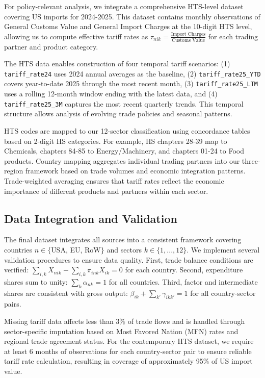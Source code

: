 For policy-relevant analysis, we integrate a comprehensive HTS-level dataset covering US imports for 2024-2025. This dataset contains monthly observations of General Customs Value and General Import Charges at the 10-digit HTS level, allowing us to compute effective tariff rates as $\tau_{nik} = \frac{\text{Import Charges}}{\text{Customs Value}}$ for each trading partner and product category.

The HTS data enables construction of four temporal tariff scenarios: (1) \texttt{tariff\_rate24} uses 2024 annual averages as the baseline, (2) \texttt{tariff\_rate25\_YTD} covers year-to-date 2025 through the most recent month, (3) \texttt{tariff\_rate25\_LTM} uses a rolling 12-month window ending with the latest data, and (4) \texttt{tariff\_rate25\_3M} captures the most recent quarterly trends. This temporal structure allows analysis of evolving trade policies and seasonal patterns.

HTS codes are mapped to our 12-sector classification using concordance tables based on 2-digit HS categories. For example, HS chapters 28-39 map to Chemicals, chapters 84-85 to Energy/Machinery, and chapters 01-24 to Food products. Country mapping aggregates individual trading partners into our three-region framework based on trade volumes and economic integration patterns. Trade-weighted averaging ensures that tariff rates reflect the economic importance of different products and partners within each sector.

\subsection{Data Integration and Validation}

The final dataset integrates all sources into a consistent framework covering countries $n \in \{$USA, EU, RoW$\}$ and sectors $k \in \{1, ..., 12\}$. We implement several validation procedures to ensure data quality. First, trade balance conditions are verified: $\sum_{i,k} X_{nik} - \sum_{i,k} \pi_{ink} X_{ik} = 0$ for each country. Second, expenditure shares sum to unity: $\sum_{k} \alpha_{nk} = 1$ for all countries. Third, factor and intermediate shares are consistent with gross output: $\beta_{ik} + \sum_{k'} \gamma_{ikk'} = 1$ for all country-sector pairs.

Missing tariff data affects less than 3\% of trade flows and is handled through sector-specific imputation based on Most Favored Nation (MFN) rates and regional trade agreement status. For the contemporary HTS dataset, we require at least 6 months of observations for each country-sector pair to ensure reliable tariff rate calculation, resulting in coverage of approximately 95\% of US import value.

